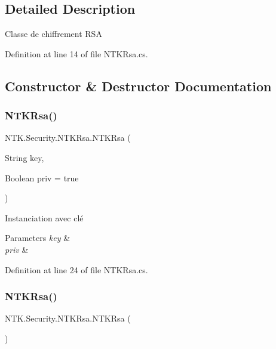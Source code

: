 \subsection{Detailed Description}
Classe de chiffrement R\+SA 



Definition at line 14 of file N\+T\+K\+Rsa.\+cs.



\subsection{Constructor \& Destructor Documentation}
\mbox{\label{class_n_t_k_1_1_security_1_1_n_t_k_rsa_a0b7a720efb1a3d7dad4244581917147c}} 
\subsubsection{\texorpdfstring{NTKRsa()}{NTKRsa()}\hspace{0.1cm}{\footnotesize\ttfamily [1/2]}}
{\footnotesize\ttfamily N\+T\+K.\+Security.\+N\+T\+K\+Rsa.\+N\+T\+K\+Rsa (\begin{DoxyParamCaption}\item[{String}]{key,  }\item[{Boolean}]{priv = {\ttfamily true} }\end{DoxyParamCaption})}



Instanciation avec clé 


\begin{DoxyParams}{Parameters}
{\em key} & \\
\hline
{\em priv} & \\
\hline
\end{DoxyParams}


Definition at line 24 of file N\+T\+K\+Rsa.\+cs.

\mbox{\label{class_n_t_k_1_1_security_1_1_n_t_k_rsa_a9d4783190577624f5db69a347f19a320}} 
\subsubsection{\texorpdfstring{NTKRsa()}{NTKRsa()}\hspace{0.1cm}{\footnotesize\ttfamily [2/2]}}
{\footnotesize\ttfamily N\+T\+K.\+Security.\+N\+T\+K\+Rsa.\+N\+T\+K\+Rsa (\begin{DoxyParamCaption}{ }\end{DoxyParamCaption})}



